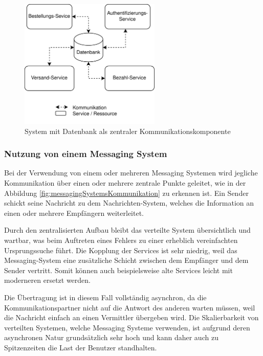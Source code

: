 \begin{figure}
    \centering
    \includegraphics[width=0.6\textwidth]{content/img/Research/Message_Services/datenbankKommunikationRabbit.png}
    \caption{System mit Datenbank als zentraler Kommunikationskomponente}
    \label{fig:datenbankKommunikationRabbit}
\end{figure}
\FloatBarrier

\subsubsection{Nutzung von einem Messaging System}

Bei der Verwendung von einem oder mehreren Messaging Systemen wird jegliche Kommunikation über einen oder mehrere zentrale Punkte geleitet, wie in der Abbildung \ref{fig:messagingSystemsKommunikation} zu erkennen ist. Ein Sender schickt seine Nachricht zu dem Nachrichten-System, welches die Information an einen oder mehrere Empfängern weiterleitet. \cite{curryMessageOrientedMiddleware2004}

Durch den zentralisierten Aufbau bleibt das verteilte System übersichtlich und wartbar, was beim Auftreten eines Fehlers zu einer erheblich vereinfachten Ursprungssuche führt.
Die Kopplung der Services ist sehr niedrig, weil das Messaging-System eine zusätzliche Schicht zwischen dem Empfänger und dem Sender vertritt. Somit können auch beispielsweise alte Services leicht mit moderneren ersetzt werden. \cite{toshevLearningRabbitMQBuild2016}

Die Übertragung ist in diesem Fall vollständig asynchron, da die Kommunikationspartner nicht auf die Antwort des anderen warten müssen, weil die Nachricht einfach an einen Vermittler übergeben wird. Die Skalierbarkeit von verteilten Systemen, welche Messaging Systeme verwenden, ist aufgrund deren asynchronen Natur grundsätzlich sehr hoch und kann daher auch zu Spitzenzeiten die Last der Benutzer standhalten. \cite{toshevLearningRabbitMQBuild2016}


